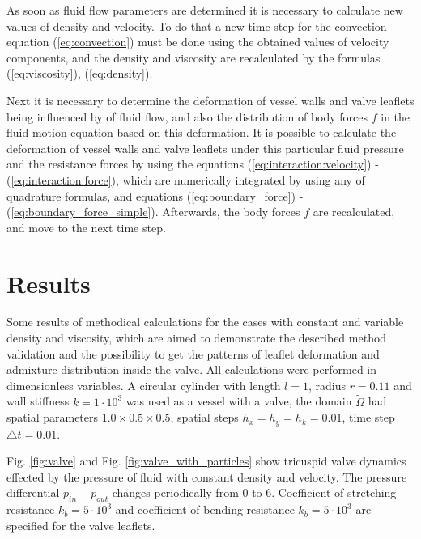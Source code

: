 \documentclass[runningheads,a4paper]{llncs}
\begin{document}
As soon as fluid flow parameters are determined it is necessary to calculate new values of density and velocity. To do that a new time step for the convection
equation (\ref{eq:convection}) must be done using the obtained values of velocity components, and the density and viscosity are recalculated
by the formulas (\ref{eq:viscosity}), (\ref{eq:density}).

Next it is necessary to determine the deformation of vessel walls and valve leaflets being influenced by of fluid flow, and also the distribution of body forces $f$
in the fluid motion equation based on this deformation. It is possible to calculate the deformation of vessel walls and valve leaflets under this particular fluid pressure
and the resistance forces by using the equations (\ref{eq:interaction:velocity}) - (\ref{eq:interaction:force}), which are numerically integrated by
using any of quadrature formulas, and equations (\ref{eq:boundary_force}) - (\ref{eq:boundary_force_simple}). Afterwards, the body forces $f$
are recalculated, and move to the next time step.

\section{Results}

Some results of methodical calculations for the cases with constant and variable density and viscosity, which are aimed to demonstrate the described method 
validation and the possibility to get the patterns of leaflet deformation and admixture distribution inside the valve.
All calculations were performed in dimensionless variables. 
A circular cylinder with length $l = 1$, radius $r = 0.11$ and wall stiffness $k = 1 \cdot 10^3$ was used as a vessel with a valve,
the domain $\tilde{\Omega}$ had spatial parameters $1.0 \times 0.5 \times 0.5$,
spatial steps $h_x = h_y = h_k = 0.01$, time step $\triangle t = 0.01$.

Fig. \ref{fig:valve} and Fig. \ref{fig:valve_with_particles} show tricuspid valve dynamics effected by the pressure of fluid with constant density and velocity.
The pressure differential $p_{in} - p_{out}$ changes periodically from 0 to 6. Coefficient of stretching resistance $k_b = 5 \cdot 10^3$ and coefficient of
bending resistance $k_b = 5 \cdot 10^3$ are specified for the valve leaflets.
\end{document}

